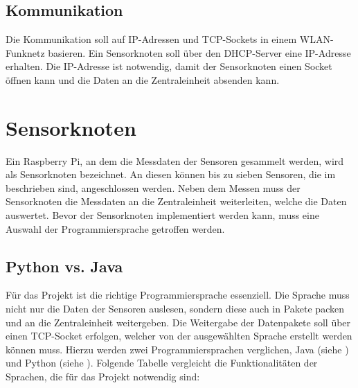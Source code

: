 \subsection{Kommunikation}
Die Kommunikation soll auf IP-Adressen und TCP-Sockets in einem WLAN-Funknetz basieren. Ein Sensorknoten soll über den \ac{DHCP}-Server eine IP-Adresse erhalten. Die IP-Adresse ist notwendig, damit der Sensorknoten einen Socket öffnen kann und die Daten an die Zentraleinheit absenden kann. 

\section{Sensorknoten}
Ein Raspberry Pi, an dem die Messdaten der Sensoren gesammelt werden, wird als Sensorknoten bezeichnet. An diesen können bis zu sieben Sensoren, die im  beschrieben sind, angeschlossen werden. Neben dem Messen muss der Sensorknoten die Messdaten an die Zentraleinheit weiterleiten, welche die Daten auswertet. Bevor der Sensorknoten implementiert werden kann, muss eine Auswahl der Programmiersprache getroffen werden.

\subsection{Python vs. Java}
Für das Projekt ist die richtige Programmiersprache essenziell. Die Sprache muss nicht nur die Daten der Sensoren auslesen, sondern diese auch in Pakete packen und an die Zentraleinheit weitergeben. Die Weitergabe der Datenpakete soll über einen TCP-Socket erfolgen, welcher von der ausgewählten Sprache erstellt werden können muss. Hierzu werden zwei Programmiersprachen verglichen, Java (siehe ) und Python (siehe ). Folgende Tabelle vergleicht die Funktionalitäten der Sprachen, die für das Projekt notwendig sind:\hfill

